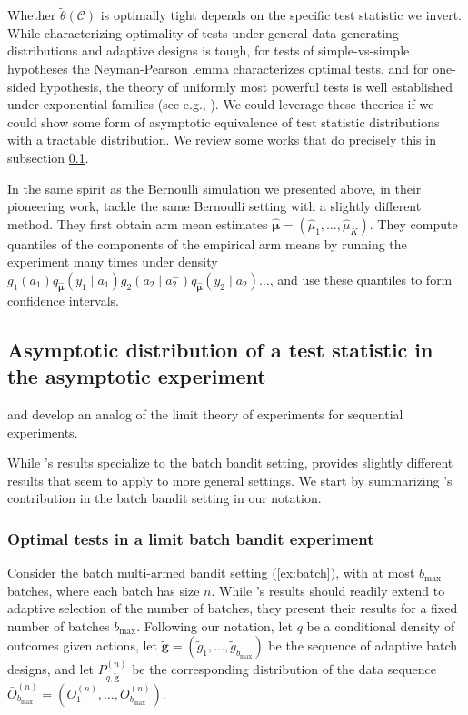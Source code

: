 Whether $\widetilde \theta(\mathcal{C})$ is optimally tight depends on the specific test statistic we invert. While characterizing optimality of tests under general data-generating distributions and adaptive designs is tough, for tests of simple-vs-simple hypotheses the Neyman-Pearson lemma characterizes optimal tests, and for one-sided hypothesis, the theory of uniformly most powerful tests is well established under exponential families (see e.g., \citealp{keener2010theoretical}). We could leverage these theories if we could show some form of asymptotic equivalence of test statistic distributions with a tractable distribution. We review some works that do precisely this in subsection \ref{sec:asymp_theory_xps}. 

In the same spirit as the Bernoulli simulation we presented above, in their pioneering work, \cite{rosenberger1999bootstrap} tackle the same Bernoulli setting with a slightly different method. They first obtain arm mean estimates $\widehat{\bm{\mu}} = (\widehat \mu_1, \ldots, \widehat \mu_K)$. They compute quantiles of the components of the empirical arm means by running the experiment many times under density $g_1(a_1) q_{\widehat{\bm{\mu}}}(y_1 \mid a_1) g_2(a_2 \mid a_2^-) q_{\widehat{\bm{\mu}}}(y_2 \mid a_2) \ldots $, and use these quantiles to form confidence intervals. 


\subsection{Asymptotic distribution of a test statistic in the asymptotic experiment}\label{sec:asymp_theory_xps}


\cite{hirano2023asymptotic} and \cite{adusumilli2023optimal} develop an analog of the limit theory of experiments \citep{van2000asymptotic} for sequential experiments. 


While \cite{hirano2023asymptotic}'s results specialize to the batch bandit setting, \cite{adusumilli2023optimal} provides slightly different results that seem to apply to more general settings. We start by summarizing \cite{hirano2023asymptotic}'s contribution in the batch bandit setting in our notation. 

\subsubsection{Optimal tests in a limit batch bandit experiment}

Consider the batch multi-armed bandit setting (\cref{ex:batch}), with at most $b_{\max}$ batches, where each batch has size $n$. While \cite{hirano2023asymptotic}'s results should readily extend to adaptive selection of the number of batches, they present their results for a fixed number of batches $b_{\max}$. Following our notation, let $q$ be a conditional density of outcomes given actions, let $\widetilde{\bm{g}} = (\widetilde g_1, \ldots, \widetilde g_{b_{\max}})$ be the sequence of adaptive batch designs, and let $P^{(n)}_{q, \widetilde{\bm{g}}}$ be the corresponding distribution of the data sequence $\bar O_{b_{\max}}^{(n)}  = (O_1^{(n)},\ldots,O_{b_{\max}}^{(n)})$. 

